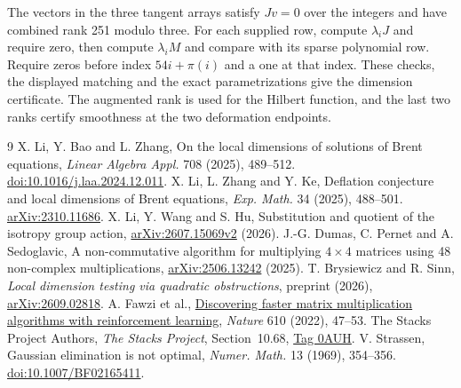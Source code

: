 \documentclass[11pt]{amsart}
\begin{document}
The vectors in the three tangent arrays satisfy $Jv=0$ over the
integers and have combined rank 251 modulo three. For each
supplied row, compute $\lambda_iJ$ and require zero, then compute
$\lambda_iM$ and compare with its sparse polynomial row. Require
zeros before index $54i+\pi(i)$ and a one at that index.
These checks, the displayed matching and the exact parametrizations
give the dimension certificate. The augmented rank is used for the
Hilbert function, and the last two ranks certify smoothness at
the two deformation endpoints.

\begin{thebibliography}{9}
 X. Li, Y. Bao and L. Zhang,
On the local dimensions of solutions of Brent equations,
\emph{Linear Algebra Appl.} 708 (2025), 489--512.
\href{https://doi.org/10.1016/j.laa.2024.12.011}{doi:10.1016/j.laa.2024.12.011}.
 X. Li, L. Zhang and Y. Ke,
Deflation conjecture and local dimensions of Brent equations,
\emph{Exp. Math.} 34 (2025), 488--501.
\href{https://arxiv.org/abs/2310.11686}{arXiv:2310.11686}.
 X. Li, Y. Wang and S. Hu,
Substitution and quotient of the isotropy group action,
\href{https://arxiv.org/abs/2607.15069v2}{arXiv:2607.15069v2} (2026).
 J.-G. Dumas, C. Pernet and A. Sedoglavic,
A non-commutative algorithm for multiplying $4\times4$ matrices using
48 non-complex multiplications,
\href{https://arxiv.org/abs/2506.13242}{arXiv:2506.13242} (2025).
 T. Brysiewicz and R. Sinn,
\emph{Local dimension testing via quadratic obstructions}, preprint
(2026), \href{https://arxiv.org/abs/2609.02818}{arXiv:2609.02818}.
 A. Fawzi et al.,
\href{https://doi.org/10.1038/s41586-022-05172-4}{Discovering faster
matrix multiplication algorithms with reinforcement learning},
\emph{Nature} 610 (2022), 47--53.
 The Stacks Project Authors,
\emph{The Stacks Project}, Section~10.68,
\href{https://stacks.math.columbia.edu/tag/0AUH}{Tag 0AUH}.
 V. Strassen,
Gaussian elimination is not optimal,
\emph{Numer. Math.} 13 (1969), 354--356.
\href{https://doi.org/10.1007/BF02165411}{doi:10.1007/BF02165411}.
\end{thebibliography}
\end{document}
